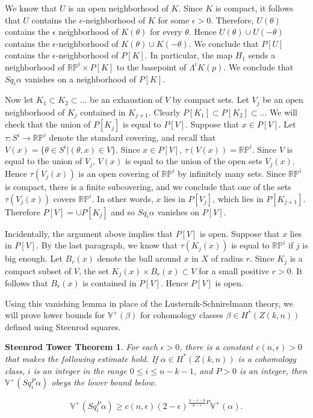 \documentclass{amsart}
\newtheorem*{Theorem 1}{Theorem 1}
\newtheorem*{Theorem 2}{Theorem 2}
\newtheorem*{Theorem 1A}{Theorem 1A}
\newtheorem*{Theorem 2A}{Theorem 2A}
\newtheorem*{theoremst}{Steenrod Tower Theorem}
\newtheorem*{vanishing lemma}{Vanishing Lemma}
\numberwithin{equation}{section}
\begin{document}
We know that $U$ is an open neighborhood of $K$.  
Since $K$ is compact, it follows that
$U$ contains the $\epsilon$-neighborhood of $K$ for some
$\epsilon > 0$.  Therefore, $U(\theta)$ contains the $\epsilon$
neighborhood of $K(\theta)$ for every $\theta$.  Hence
$U(\theta) \cup U(- \theta)$ contains the $\epsilon$-neighborhood
of $K(\theta) \cup K(- \theta)$.  We conclude that $P[U]$ contains
the $\epsilon$-neighborhood of $P[K]$.  In particular, the map
$H_1$ sends a neighborhood of $\mathbb{RP}^i \times P[K]$ to the
basepoint of $\Lambda^i K(p)$.  We conclude that $Sq_i \alpha$
vanishes on a neighborhood of $P[K]$.

Now let $K_1 \subset K_2 \subset ...$ be an exhaustion of $V$
by compact sets.  Let $V_j$ be an open neighborhood of $K_j$
contained in $K_{j+1}$.  Clearly $P[K_1] \subset P[K_2] \subset ...$
We will check that the union of $P[K_j]$ is equal to $P[V]$.
Suppose that $x \in P[V]$.  Let $\tau: S^i \rightarrow \mathbb{RP}^i$ denote
the standard covering, and recall that $V(x) = \{ \theta \in S^i | (\theta, x) \in V \}$.  
Since $x \in P[V]$, $\tau(V(x))
 = \mathbb{RP}^i$.  Since $V$ is equal to the union of $V_j$, $V(x)$ is
equal to the union of the open sets $V_j(x)$.  Hence $\tau(V_j(x))$ is an
open covering of $\mathbb{RP}^i$ by infinitely many sets.  Since
$\mathbb{RP}^i$ is compact, there is a finite subcovering, and we conclude
that one of the sets $\tau(V_j(x))$ covers $\mathbb{RP}^i$.
In other words, $x$ lies in $P[V_j]$, which lies in $P[K_{j+1}]$.  Therefore
$P[V] = \cup P[K_j]$ and so $Sq_i \alpha$ vanishes on $P[V]$.

Incidentally, the argument above implies that $P[V]$ is open.
Suppose that $x$ lies in $P[V]$.  By the last paragraph, we know that $\tau(K_j(x))$
is equal to $\mathbb{RP}^i$ if $j$ is big enough.  Let $B_r(x)$ denote the ball
around $x$ in $X$ of radius $r$.  Since $K_j$ is a compact subset of $V$, the set
$K_j(x) \times B_r(x) \subset V$ for a small positive $r > 0$.  It follows
that $B_r(x)$ is contained in $P[V]$.  Hence $P[V]$ is open. \endproof

Using this vanishing lemma in place of the Lusternik-Schnirelmann
theory, we will prove lower bounds for $\mathbb{V}^+(\beta)$ for
cohomology classes $\beta \in H^*(Z(k,n))$ defined using Steenrod
squares.

\begin{theoremst} For each $\epsilon > 0$, there is a constant
$c(n, \epsilon) > 0$ that makes the following estimate hold.
If $\alpha \in H^*(Z(k,n))$ is a cohomology class, $i$ is an integer
in the range $0 \le i \le n-k-1$, and $P > 0$ is an integer, then
$\mathbb{V}^+(Sq_i^P \alpha)$ obeys the lower bound below.

$$\mathbb{V}^+(Sq_i^P \alpha) \ge c(n,\epsilon) (2 -
\epsilon)^{\frac{n-i-k}{n-i} P} \mathbb{V}^+(\alpha).$$
\end{theoremst}
\end{document}
